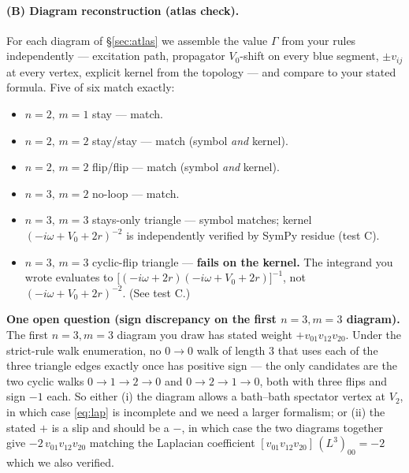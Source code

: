 \documentclass[11pt,a4paper]{article}
\begin{document}
\paragraph{(B) Diagram reconstruction (atlas check).}
For each diagram of \S\ref{sec:atlas} we assemble the value
$\Gamma$ from your rules independently --- excitation path, propagator
$V_{0}$-shift on every blue segment, $\pm v_{ij}$ at every vertex,
explicit kernel from the topology --- and compare to your stated
formula. Five of six match exactly:
\begin{itemize}[leftmargin=2em,itemsep=2pt]
\item $n{=}2,\,m{=}1$ stay --- match.
\item $n{=}2,\,m{=}2$ stay/stay --- match (symbol \emph{and} kernel).
\item $n{=}2,\,m{=}2$ flip/flip --- match (symbol \emph{and} kernel).
\item $n{=}3,\,m{=}2$ no-loop --- match.
\item $n{=}3,\,m{=}3$ stays-only triangle --- symbol matches; kernel
$(-i\omega+V_{0}+2r)^{-2}$ is independently verified by
SymPy residue (test C).
\item $n{=}3,\,m{=}3$ cyclic-flip triangle --- \textbf{fails on the
kernel.} The integrand you wrote evaluates to
$\big[(-i\omega+2r)(-i\omega+V_{0}+2r)\big]^{-1}$, not
$(-i\omega+V_{0}+2r)^{-2}$. (See test C.)
\end{itemize}
\textbf{One open question (sign discrepancy on the first $n{=}3,m{=}3$
diagram).} The first $n{=}3,m{=}3$ diagram you draw has stated weight
$+v_{01}v_{12}v_{20}$. Under the strict-rule walk enumeration, no
$0\!\to\!0$ walk of length $3$ that uses each of the three triangle
edges exactly once has positive sign --- the only candidates are the
two cyclic walks $0\!\to\!1\!\to\!2\!\to\!0$ and
$0\!\to\!2\!\to\!1\!\to\!0$, both with three flips and sign $-1$ each.
So either (i) the diagram allows a bath--bath spectator vertex at
$V_{2}$, in which case \eqref{eq:lap} is incomplete and we need a
larger formalism; or (ii) the stated $+$ is a slip and should be a $-$,
in which case the two diagrams together give
$-2\,v_{01}v_{12}v_{20}$ matching the Laplacian coefficient
$[v_{01}v_{12}v_{20}]\,(L^{3})_{00}=-2$ which we also verified.
\end{document}
